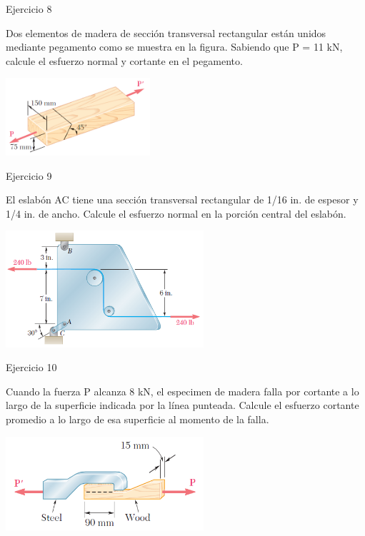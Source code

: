 \documentclass[12pt,letterpaper]{article}
\begin{document}
\begin{ejemplo}{Ejercicio 8}

Dos elementos de madera de sección transversal rectangular están unidos mediante pegamento como se muestra en la figura. Sabiendo que 
P = 11 kN, calcule el esfuerzo normal y cortante en el pegamento.

\begin{center}
\includegraphics[width=0.4\textwidth]{img/p08.PNG}
\end{center}

\end{ejemplo}


\begin{ejemplo}{Ejercicio 9}

El eslabón AC tiene una sección transversal rectangular de 1/16 in. de espesor y 1/4 in. de ancho. Calcule 
el esfuerzo normal en la porción central del eslabón.

\begin{center}
\includegraphics[width=0.55\textwidth]{img/p09.PNG}
\end{center}

\end{ejemplo}


\begin{ejemplo}{Ejercicio 10}

Cuando la fuerza P alcanza 8 kN, el especimen de madera falla por cortante a lo largo de la superficie indicada 
por la línea punteada. Calcule el esfuerzo cortante promedio a lo largo de esa superficie al momento de la falla.

\begin{center}
\includegraphics[width=0.55\textwidth]{img/p10.PNG}
\end{center}

\end{ejemplo}
\end{document}
